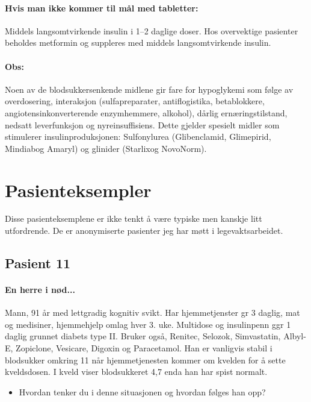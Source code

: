 					\paragraph{Hvis man ikke kommer til mål med tabletter:\\} Middels langsomtvirkende insulin i 1–2 daglige doser. Hos overvektige pasienter beholdes metformin og suppleres med middels langsomtvirkende insulin.

					\paragraph{Obs:\\}Noen av de blodsukkersenkende midlene gir fare for hypoglykemi som følge av overdosering, interaksjon (sulfapreparater, antiflogistika, betablokkere, angiotensinkonverterende enzymhemmere, alkohol), dårlig ernæringstilstand, nedsatt leverfunksjon og nyreinsuffisiens. Dette gjelder spesielt midler som stimulerer insulinproduksjonen: Sulfonylurea (Glibenclamid\textregistered, Glimepirid\textregistered, Mindiab\textregistered og Amaryl\textregistered) og glinider (Starlix\textregistered og NovoNorm\textregistered).
		\section{Pasienteksempler}
			Disse pasienteksemplene er ikke tenkt å være typiske men kanskje litt utfordrende. De er anonymiserte pasienter jeg har møtt i legevaktsarbeidet. 
			\subsection{Pasient 11}
				\paragraph{En herre i nød...\\}
					Mann, 91 år med lettgradig kognitiv svikt. Har hjemmetjenster gr 3 daglig, mat og medisiner, hjemmehjelp omlag hver 3. uke. Multidose og insulinpenn ggr 1 daglig grunnet diabets type II. Bruker også, Renitec, Selozok, Simvastatin, Albyl-E, Zopiclone, Vesicare, Digoxin og Paracetamol. Han er vanligvis stabil i blodsukker omkring 11 når hjemmetjenesten kommer om kvelden for å sette kveldsdosen. I kveld viser blodsukkeret 4,7 enda han har spist normalt.

					\begin{itemize}
						\item Hvordan tenker du i denne situasjonen og hvordan følges han opp?\\
					\end{itemize}
